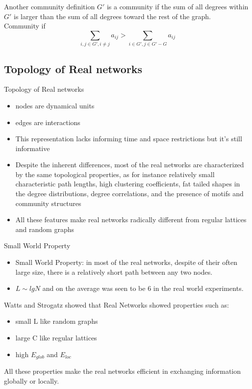 \documentclass{beamer}
\begin{document}

\begin{frame}{Another community definition}
$G'$ is a community if the sum of all degrees within $G'$ is larger than the sum of all degrees toward the rest of the graph.\\

Community if \[ \sum_{i,j \in G', i \neq j} a_{ij} > \sum_{i \in G', j \in G'-G} a_{ij} \]

\end{frame}

\subsection{Topology of Real networks}
\begin{frame}{Topology of Real networks}

\begin{itemize}
 \item nodes are dynamical units
 \item edges are interactions
 \item This representation lacks informing time and space restrictions but it's still informative
 \item Despite the inherent differences, most of the real networks are characterized by the same topological properties, as for instance relatively small characteristic path lengths, high clustering coefficients, fat tailed shapes in the degree distributions, degree correlations, and the presence of motifs and community structures
 \item All these features make real networks radically different from regular lattices and random graphs
\end{itemize}

\end{frame}


\begin{frame}{Small World Property}

\begin{itemize}
 \item Small World Property: in most of the real networks, despite of their often large size, there is a relatively short path between any two nodes.
 \item $L \sim lgN$ and on the average was seen to be 6 in the real world experiments.
\end{itemize}
Watts and Strogatz showed that Real Networks showed properties such as:
\begin{itemize}
 \item small L like random graphs
 \item large C like regular lattices
 \item high $E_{glob}$ and $E_{loc}$
\end{itemize}
All these properties make the real networks efficient in exchanging information globally or locally.


\end{frame}
\end{document}
